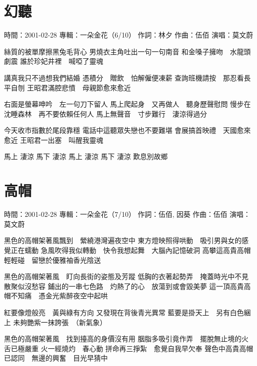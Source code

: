 \documentclass[UTF8,a4paper,oneside,twocolumn,12pt]{ctexbook}
\newcommand{\infopair}[2]{\textbullet #1：#2}
\newcommand{\zc}[1][伍佰]{\infopair{作詞}{#1}}
\newcommand{\zq}[1][伍佰]{\infopair{作曲}{#1}}
\newcommand{\zj}[1]{\infopair{專輯}{#1}}
\newcommand{\sj}[1]{\infopair{時間}{#1}}
\newenvironment{info}{\begin{flushleft}\kaishu
	}
	{\end{flushleft}\normalsize\yahei\par}
\newenvironment{lyric}{
	}
{}
\begin{document}
\section{幻聽}
\begin{info}
	\sj{2001-02-28}
	\zj{一朵金花（6/10）}
	\zc[林夕]
	\zq
	\infopair{演唱}{莫文蔚}
\end{info}
\begin{lyric}
	絲質的被單摩擦黑兔毛背心
	男燒衣主角吐出一句一句南音
	和金嗓子擁吻　水龍頭劇震
	誰於珍妃井裡　喊啞了靈魂

	講真我只不過想我們結婚
	憑積分　贈飲　怕解僱便凍薪
	查詢班機請按　那忍看長平自刎
	王昭君滿腔悲憤　母親節愈來愈近

	右面是螢幕呻吟　左一句刀下留人
	馬上爬起身　又再做人　聽身歷聲慰問
	慢步在沈睡森林　再不要依賴任何人
	馬上無聲音　寸步難行　淒涼得過分

	今天收市指數於尾段靠穩
	電話中這聽眾失戀也不要難堪
	會展搞首映禮　天國愈來愈近
	王昭君一出塞　叫醒我靈魂

	馬上 淒涼 馬下 淒涼
	馬上 淒涼 馬下 淒涼
	歎息別故鄉
\end{lyric}

\section{高帽}
\begin{info}
	\sj{2001-02-28}
	\zj{一朵金花（7/10）}
	\zc[伍佰, 因葵]
	\zq
	\infopair{演唱}{莫文蔚}
\end{info}
\begin{lyric}
	黑色的高帽架著風飄到　縈繞港灣遍夜空中
	東方燈映照得哄動　吸引男與女的感覺正在蠕動
	急風吹得我似轉動　快令我想起舞　大腦內記憶破洞
	高攀這高貴高帽輕輕碰　留戀於優雅袖香光陰送

	黑色的高帽架著風　盯向長街的姿態及芳蹤
	低胸的衣著起勢弄　掩蓋時光中不見散聚似沒愁容
	鋪出的一串七色路　灼熱了的心　放蕩到或會毀美夢
	這一頂高貴高帽不知痛　憑金光紫醉夜空中起哄

	紅要像燈般亮　黃與綠有方向
	又發現在背後青光異常
	藍要是掛天上　另有白色綑上
	未夠艷紫一抹誇張　（新氣象）

	黑色的高帽架著風　找到擡高的身價沒有用
	胭脂多吸引竟作弄　擺脫無止境的火舌已極嚴重
	火一經燒灼　春心動
	拼命再三掙紮　愈覺自我早欠奉
	聲色中高貴高帽已認同　無邊的興奮　目光早猜中
\end{lyric}
\end{document}
